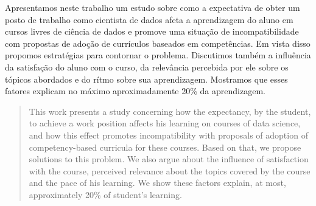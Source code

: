 \begin{resumo}
Apresentamos neste trabalho um estudo sobre como a expectativa de obter um posto de trabalho como cientista de dados afeta a aprendizagem do aluno em cursos livres de ciência de dados e promove uma situação de incompatibilidade com propostas de adoção de currículos baseados em competências.
Em vista disso propomos estratégias para contornar o problema.
Discutimos também a influência da satisfação do aluno com o curso, da relevância percebida por ele sobre os tópicos abordados e do rítmo sobre sua aprendizagem.
Mostramos que esses fatores explicam no máximo aproximadamente 20\% da aprendizagem.
\end{resumo}

\begin{abstract}
This work presents a study concerning how the expectancy, by the student, to achieve a work position affects his learning on courses of data science, and how this effect promotes incompatibility with proposals of adoption of competency-based curricula for these courses.
Based on that, we propose solutions to this problem.
We also argue about the influence of satisfaction with the course, perceived relevance about the topics covered by the course and the pace of his learning.
We show these factors explain, at most, approximately 20\% of student's learning.
\end{abstract}